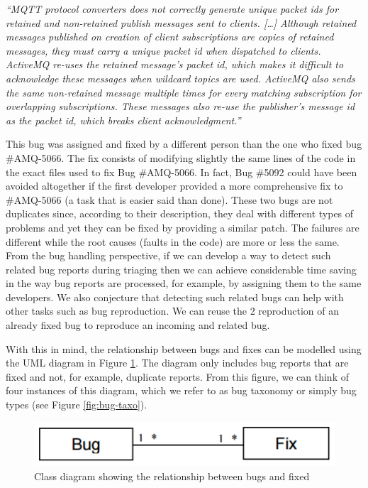\documentclass[12pt]{report}
\begin{document}
\emph{``MQTT protocol converters does not correctly generate unique
packet ids for retained and non-retained publish messages sent to
clients. {[}\ldots{}{]} Although retained messages published on creation
of client subscriptions are copies of retained messages, they must carry
a unique packet id when dispatched to clients. ActiveMQ re-uses the
retained message's packet id, which makes it difficult to acknowledge
these messages when wildcard topics are used. ActiveMQ also sends the
same non-retained message multiple times for every matching subscription
for overlapping subscriptions. These messages also re-use the
publisher's message id as the packet id, which breaks client
acknowledgment.''}

This bug was assigned and fixed by a different person than the one who
fixed bug \#AMQ-5066. The fix consists of modifying slightly the same
lines of the code in the exact files used to fix Bug \#AMQ-5066. In
fact, Bug \#5092 could have been avoided altogether if the first
developer provided a more comprehensive fix to \#AMQ-5066 (a task that
is easier said than done). These two bugs are not duplicates since,
according to their description, they deal with different types of
problems and yet they can be fixed by providing a similar patch. The
failures are different while the root causes (faults in the code) are
more or less the same. From the bug handling perspective, if we can
develop a way to detect such related bug reports during triaging then we
can achieve considerable time saving in the way bug reports are
processed, for example, by assigning them to the same developers. We
also conjecture that detecting such related bugs can help with other
tasks such as bug reproduction. We can reuse the 2 reproduction of an
already fixed bug to reproduce an incoming and related bug.

With this in mind, the relationship between bugs and fixes can be
modelled using the UML diagram in Figure \ref{fig:bug-taxo-diag}. The
diagram only includes bug reports that are fixed and not, for example,
duplicate reports. From this figure, we can think of four instances of
this diagram, which we refer to as bug taxonomy or simply bug types (see
Figure \ref{fig:bug-taxo}).

\begin{figure}[h!]
  \centering
    \includegraphics[scale=0.5]{media/chap9/bug-taxo-class-diag.png}
    \caption{Class diagram showing the relationship between bugs and fixed
    \label{fig:bug-taxo-diag}}
\end{figure}
\end{document}
